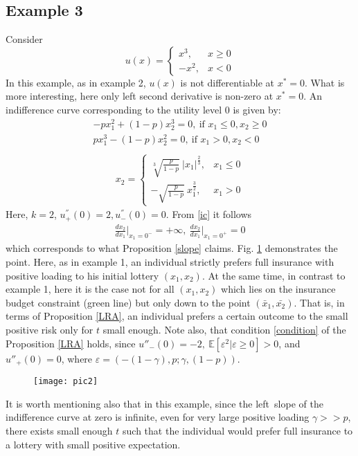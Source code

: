 \documentclass[a4paper]{article}
\newcommand{\expect}{\mathbb{E}}
\newcommand{\eps}{\varepsilon}
\begin{document}
\subsection{Example 3}
Consider $$u(x) = \begin{cases}
	x^3, &x \ge 0\\-x^2, &x < 0
\end{cases}$$
In this example, as in example 2, $u(x)$ is not differentiable at $x^*=0$. What is more interesting, here only left second derivative is non-zero at $x^*=0$.
An indifference curve corresponding to the utility level 0 is given by:
\begin{align*}
	-px_1^2 + (1-p)x_2^3 = 0,\ \text{if } x_1 \le 0, x_2 \ge 0\\
	px_1^3-(1-p)x_2^2 = 0,\ \text{if } x_1 > 0, x_2 < 0\\
\end{align*}
\begin{align}	\label{ic}
	x_2 = \begin{cases} 
	\sqrt[3]{\frac{p}{1-p}}\ |x_1|^{\frac{2}{3}}, &x_1\le0\\
	-\sqrt{\frac{p}{1-p}}\ x_1^{\frac{3}{2}}, &x_1>0
	\end{cases}
\end{align}
Here, $k=2$, $u^{''}_{+}(0) = 2, u^{''}_{-}(0) = 0$. From \eqref{ic} it follows
\begin{align*}
	\frac{dx_2}{dx_1}\bigg|_{x_1=0^-} = +\infty,\  \frac{dx_2}{dx_1}\bigg|_{x_1=0^+} = 0
\end{align*}
which corresponds to what Proposition \ref{slope} claims. Fig. \ref{fig2} demonstrates the point. Here, as in example 1, an individual strictly prefers full insurance with positive loading to his initial lottery $(x_1, x_2)$. At the same time, in contrast to example 1, here it is the case not for all $(x_1, x_2)$ which lies on the insurance budget constraint (green line) but only down to the point $(\bar{x}_1, \bar{x_2})$. That is, in terms of Proposition \ref{LRA}, an individual prefers a certain outcome to the small positive risk only for $t$ small enough. Note also, that condition \eqref{condition} of the Proposition \ref{LRA} holds, since $u''_{-}(0) = -2,\ \expect[\eps^2|\eps\ge0] > 0$, and $u''_{+}(0) = 0$, where $\eps = (-(1-\gamma), p; \gamma, (1-p))$. 



\begin{figure}[H]
	\centering
	\texttt{[image: pic2]}
	\caption{}\label{fig2}
\end{figure}
It is worth mentioning also that in this example, since the left slope of the indifference curve at zero is infinite, even for very large positive loading $\gamma >> p$, there exists small enough $t$ such that the individual would prefer full insurance to a lottery with small positive expectation.
\end{document}
